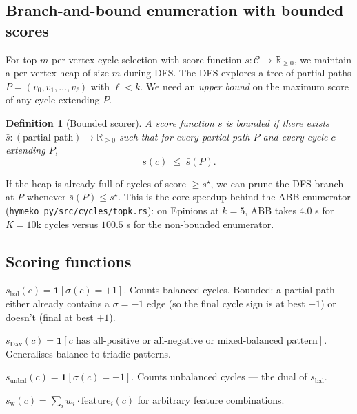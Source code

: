 \documentclass[11pt,a4paper]{article}
\newtheorem{definition}[theorem]{Definition}
\theoremstyle{remark}
\newcommand{\R}{\mathbb{R}}
\newcommand{\indic}[1]{\mathbf{1}\!\left[#1\right]}
\begin{document}
\subsection{Branch-and-bound enumeration with bounded scores}\label{ssec:branch-and-bound}

For top-$m$-per-vertex cycle selection with score function
$s : \mathcal{C} \to \R_{\geq 0}$, we maintain a per-vertex heap
of size $m$ during DFS. The DFS explores a tree of partial paths
$P = (v_0, v_1, \dots, v_\ell)$ with $\ell < k$. We need an
\emph{upper bound} on the maximum score of any cycle extending
$P$.

\begin{definition}[Bounded scorer]
A score function $s$ is \emph{bounded} if there exists
$\bar s : (\text{partial path}) \to \R_{\geq 0}$ such that for every
partial path $P$ and every cycle $c$ extending $P$,
\[
  s(c) \;\leq\; \bar s(P).
\]
\end{definition}

If the heap is already full of cycles of score $\geq s^\star$,
we can prune the DFS branch at $P$ whenever $\bar s(P) \leq s^\star$.
This is the core speedup behind the ABB enumerator
(\texttt{hymeko\_py/src/cycles/topk.rs}): on Epinions at $k = 5$,
ABB takes $4.0$ s for $K = 10$k cycles versus $100.5$ s for the
non-bounded enumerator.

\subsection{Scoring functions}

\begin{description}[font=\normalfont\emph]
\item[Balance fraction] $s_{\text{bal}}(c) = \indic{\sigma(c) = +1}$.
      Counts balanced cycles. Bounded: a partial path either
      already contains a $\sigma = -1$ edge (so the final cycle
      sign is at best $-1$) or doesn't (final at best $+1$).
\item[Davis index] $s_{\text{Dav}}(c) = \indic{c \text{ has all-positive or all-negative or mixed-balanced pattern}}$.
      Generalises balance to triadic patterns.
\item[Unbalanced fraction] $s_{\text{unbal}}(c) = \indic{\sigma(c) = -1}$.
      Counts unbalanced cycles --- the dual of $s_{\text{bal}}$.
\item[Weighted sum] $s_{\text{w}}(c) = \sum_i w_i \cdot \text{feature}_i(c)$
      for arbitrary feature combinations.
\end{description}
\end{document}
